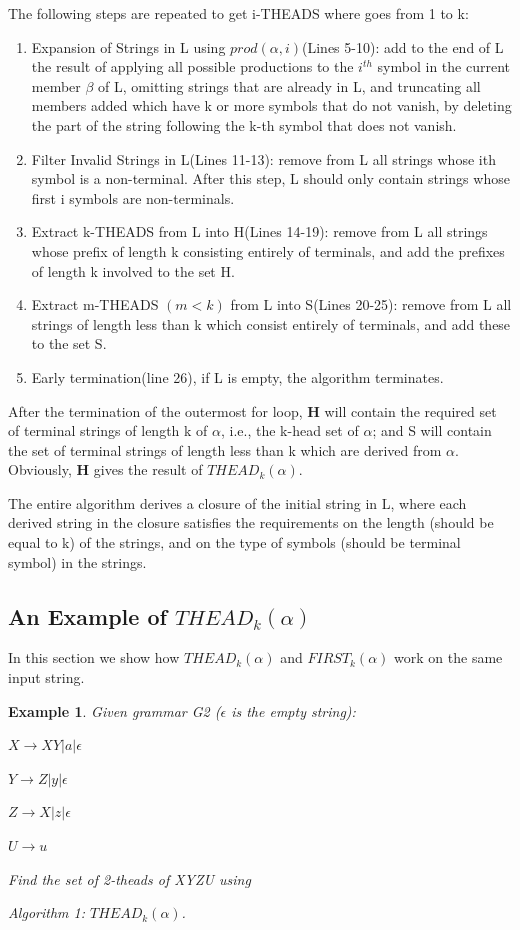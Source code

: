 \documentclass{sig-alternate-05-2015}
\newtheorem{SampleEnv}{Example}[section]
\begin{document}
The following steps are repeated to get i-THEADS where goes from 1 to k:
\begin{enumerate}
\item
Expansion of Strings in L using $prod(\alpha, i)$(Lines 5-10): add to the end of L the result of applying
all possible productions to the $i^{th}$ symbol in the current
member $\beta$ of L, omitting strings that are already in L, and
truncating all members added which have k or more symbols
that do not vanish, by deleting the part of the string
following the k-th symbol that does not vanish.
\item
Filter Invalid Strings in L(Lines 11-13): remove from L all strings whose ith symbol
is a non-terminal. After this step, L should only contain strings whose first i symbols are non-terminals.
\item
Extract k-THEADS from L into H(Lines 14-19): remove from L all strings whose prefix of
length k consisting entirely of terminals, and add the prefixes
of length k involved to the set H.
\item
Extract m-THEADS $(m<k)$ from L into S(Lines 20-25): remove from L all strings of length less
than k which consist entirely of terminals, and add these to
the set S.
\item
Early termination(line 26), if L is empty, the algorithm terminates. 
\end{enumerate}

After the termination of the outermost for loop, \textbf{H}
will contain the required set of terminal strings of
length k of $\alpha$, i.e., the k-head set of $\alpha$; and S will contain the
set of terminal strings of length less than k which are derived
from $\alpha$. Obviously, \textbf{H} gives the result of $THEAD_k(\alpha)$.

The entire algorithm derives a closure of the initial
string in L, where each derived string in the closure satisfies
the requirements on the length (should be equal to k) of
the strings, and on the type of symbols (should be terminal
symbol) in the strings.

\subsection{An Example of $THEAD_k(\alpha)$}
In this section we show how $THEAD_k(\alpha)$ and $FIRST_k(\alpha)$
work on the same input string.

\begin{SampleEnv}



Given grammar G2 ($\epsilon$ is the empty string): 

$X\rightarrow XY | a | \epsilon $

$Y\rightarrow Z | y | \epsilon$

$Z\rightarrow X | z | \epsilon$

$U\rightarrow u$

Find the set of 2-theads of XYZU using 

Algorithm 1:
$THEAD_k(\alpha)$.
\end{SampleEnv}
\end{document}
